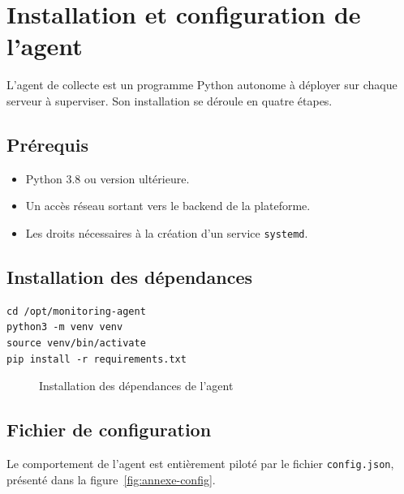 \thispagestyle{fancy}

\newsavebox{\annexbox}

\chapter{Installation et configuration de l'agent}

L'agent de collecte est un programme Python autonome à déployer sur chaque serveur à
superviser. Son installation se déroule en quatre étapes.

\section{Prérequis}
\begin{itemize}[label=]
  \item Python 3.8 ou version ultérieure.
  \item Un accès réseau sortant vers le backend de la plateforme.
  \item Les droits nécessaires à la création d'un service \texttt{systemd}.
\end{itemize}

\section{Installation des dépendances}

\begin{lrbox}{\annexbox}
\begin{minipage}{0.88\textwidth}
\begin{verbatim}
cd /opt/monitoring-agent
python3 -m venv venv
source venv/bin/activate
pip install -r requirements.txt
\end{verbatim}
\end{minipage}
\end{lrbox}
\begin{figure}[H]
\centering
\fbox{\usebox{\annexbox}}
\caption{Installation des dépendances de l'agent}
\label{fig:annexe-install}
\end{figure}

\section{Fichier de configuration}
Le comportement de l'agent est entièrement piloté par le fichier \texttt{config.json},
présenté dans la figure~\ref{fig:annexe-config}.

